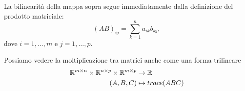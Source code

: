 \begin{remark}
	La bilinearità della mappa sopra segue immediatamente dalla definizione del prodotto matriciale:
	\begin{equation}
		\label{eq:matmul_component}
		(AB)_{ij} = \sum_{k=1}^n a_{ik}b_{kj},
	\end{equation} dove $ i = 1, \ldots, m $ e $ j = 1, \ldots,p $.
\end{remark}

\begin{remark}
	\label{rmk:triliear_matmul}
	Possiamo vedere la moltiplicazione tra matrici anche come una forma trilineare
	\begin{equation*}
		\begin{aligned}
			\mathbb{R}^{m\times n} \times \mathbb{R}^{n\times p} \times \mathbb{R}^{m\times p} & \to \mathbb{R}                      \\
			(A,B,C)                                                    & \mapsto \mathop{trace}(ABC)
		\end{aligned}
	\end{equation*}
\end{remark}

